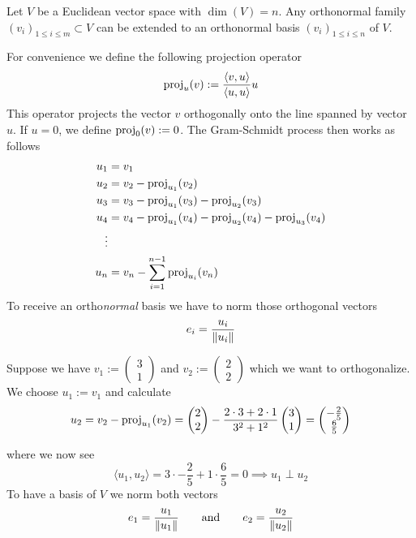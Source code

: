 \begin{proposition}\label{pro:gram-schmidt}
   Let \(V\) be a Euclidean vector space with \(\dim(V) = n\).
   Any orthonormal family \((v_i)_{1 \leq i \leq m} \subset V\) can be extended to an orthonormal basis \((v_i)_{1 \leq i \leq n}\) of \(V\).
\end{proposition}
\begin{example}
   For convenience we define the following projection operator
   \[\operatorname{proj}_u(v) := \frac{\langle v, u\rangle}{\langle u, u\rangle} u\]
   This operator projects the vector \(v\) orthogonally onto the line spanned by vector \(u\).
   If \(u = 0\), we define \(\operatorname{proj}_0(v) := 0\).
   The Gram-Schmidt process then works as follows
   \begin{equation*}
      \begin{split}
         u_1 & = v_1\\
         u_2 & = v_2 - \operatorname{proj}_{u_1}(v_2)\\
         u_3 & = v_3 - \operatorname{proj}_{u_1}(v_3) - \operatorname{proj}_{u_2}(v_3)\\
         u_4 & = v_4 - \operatorname{proj}_{u_1}(v_4) - \operatorname{proj}_{u_2}(v_4) - \operatorname{proj}_{u_3}(v_4)\\
             \vdots\\
         u_n & = v_n - \sum_{i=1}^{n-1} \operatorname{proj}_{u_i}(v_n)
      \end{split}
   \end{equation*}
   To receive an ortho\emph{normal} basis we have to norm those orthogonal vectors
   \[e_i = \frac{u_i}{\left\lVert u_i\right\rVert}\]
\end{example}
\begin{example}
   Suppose we have \(v_1 := \begin{pmatrix}3\\1\end{pmatrix}\) and \(v_2 := \begin{pmatrix}2\\2\end{pmatrix}\) which we want to orthogonalize.
   We choose \(u_1 := v_1\) and calculate
   \[u_2 = v_2 - \operatorname{proj}_{u_1}(v_2) = \begin{pmatrix}2\\2\end{pmatrix} - \frac{2 \cdot 3 + 2 \cdot 1}{3^2 + 1^2} \begin{pmatrix}3\\1\end{pmatrix} = \begin{pmatrix}-\frac{2}{5}\\\frac{6}{5}\end{pmatrix}\]

   \begin{center}
      
   \end{center}

   where we now see
   \[\langle u_1, u_2 \rangle = 3 \cdot -\frac{2}{5} + 1 \cdot \frac{6}{5} = 0 \implies u_1 \perp u_2\]
   To have a basis of \(V\) we norm both vectors
   \[e_1 = \frac{u_1}{\left\lVert u_1\right\rVert} \qquad\text{and}\qquad e_2 = \frac{u_2}{\left\lVert u_2\right\rVert}\]
\end{example}


